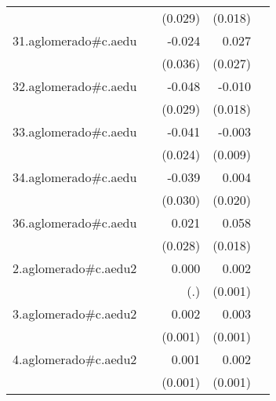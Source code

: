 {\begin{longtable}{l*{4}{D{.}{.}{-1}}}
            &                     &     (0.029)         &     (0.018)         &                     \\
\addlinespace
31.aglomerado#c.aedu&                     &      -0.024         &       0.027         &                     \\
            &                     &     (0.036)         &     (0.027)         &                     \\
\addlinespace
32.aglomerado#c.aedu&                     &      -0.048         &      -0.010         &                     \\
            &                     &     (0.029)         &     (0.018)         &                     \\
\addlinespace
33.aglomerado#c.aedu&                     &      -0.041         &      -0.003         &                     \\
            &                     &     (0.024)         &     (0.009)         &                     \\
\addlinespace
34.aglomerado#c.aedu&                     &      -0.039         &       0.004         &                     \\
            &                     &     (0.030)         &     (0.020)         &                     \\
\addlinespace
36.aglomerado#c.aedu&                     &       0.021         &       0.058\sym{***}&                     \\
            &                     &     (0.028)         &     (0.018)         &                     \\
\addlinespace
2.aglomerado#c.aedu2&                     &       0.000         &       0.002         &                     \\
            &                     &         (.)         &     (0.001)         &                     \\
\addlinespace
3.aglomerado#c.aedu2&                     &       0.002         &       0.003\sym{**} &                     \\
            &                     &     (0.001)         &     (0.001)         &                     \\
\addlinespace
4.aglomerado#c.aedu2&                     &       0.001         &       0.002\sym{**} &                     \\
            &                     &     (0.001)         &     (0.001)         &                     \\

\end{longtable}}

